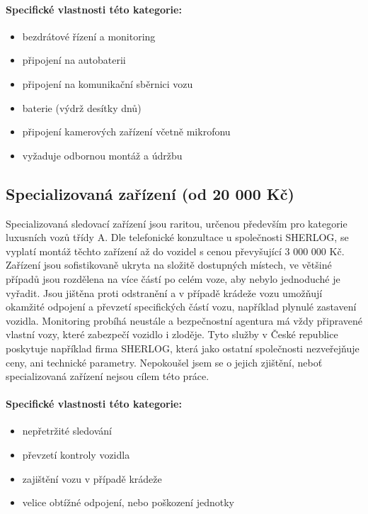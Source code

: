 \documentclass[FM,BP]{tulthesis}  %
\begin{document}
\paragraph{Specifické vlastnosti této kategorie:}
\begin{itemize}
\item bezdrátové řízení a monitoring
\item připojení na autobaterii
\item připojení na komunikační sběrnici vozu
\item baterie (výdrž desítky dnů)
\item připojení kamerových zařízení včetně mikrofonu
\item vyžaduje odbornou montáž a údržbu
\end{itemize}

\subsection{Specializovaná zařízení (od 20 000 Kč)}
Specializovaná sledovací zařízení jsou raritou, určenou především pro kategorie luxusních vozů třídy A. Dle telefonické konzultace u společnosti SHERLOG, se vyplatí montáž těchto zařízení až do vozidel s cenou převyšující 3 000 000 Kč. Zařízení jsou sofistikovaně ukryta na složitě dostupných místech, ve většiné případů jsou rozdělena na více částí po celém voze, aby nebylo jednoduché je vyřadit. Jsou jištěna proti odstranění a v případě krádeže vozu umožňují okamžité odpojení a převzetí specifických částí vozu, například plynulé zastavení vozidla. Monitoring probíhá neustále a bezpečnostní agentura má vždy připravené vlastní vozy, které zabezpečí vozidlo i zloděje. Tyto služby v České republice poskytuje například firma SHERLOG, která jako ostatní společnosti nezveřejňuje ceny, ani technické parametry. Nepokoušel jsem se o jejich zjištění, neboť specializovaná zařízení nejsou cílem této práce. 

\paragraph{Specifické vlastnosti této kategorie:}
\begin{itemize}
\item nepřetržité sledování
\item převzetí kontroly vozidla
\item zajištění vozu v případě krádeže
\item velice obtížné odpojení, nebo poškození jednotky
\end{itemize}
\end{document}
